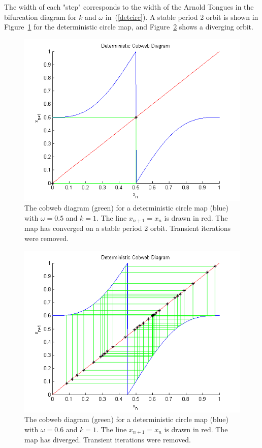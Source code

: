 The width of each "step" corresponds to the
width of the Arnold Tongues in the bifurcation diagram for $k$ and
$\omega$ in~(\ref{detcirc}). A stable period 2 orbit is shown in
Figure~\ref{fig:dcircstable} for the deterministic circle map, and
Figure~\ref{fig:rcircunstable} shows a diverging orbit.
\begin{figure}[!h]
\caption[Deterministic circle map, stable orbit]{The cobweb
  diagram (green) for a deterministic circle map (blue) with $\omega =
  0.5$ and $k=1$. The line $x_{n+1}=x_n$ is drawn in red. The map
  has converged on a stable period 2 orbit. Transient iterations were removed.}\label{fig:dcircstable}
	\begin{center}
		\includegraphics[scale=0.7]{figs/detcirc_cobweb_2.png}
	\end{center}
\end{figure}
\begin{figure}[!h]
\caption[Deterministic circle map, unstable orbit]{The cobweb
  diagram (green) for a deterministic circle map (blue) with $\omega =
  0.6$ and $k=1$. The line $x_{n+1}=x_n$ is drawn in red. The map
  has diverged. Transient iterations were removed.}\label{fig:rcircunstable}
	\begin{center}
		\includegraphics[scale=0.7]{figs/detcirc_cobweb_chaos.png}
	\end{center}
\end{figure}

